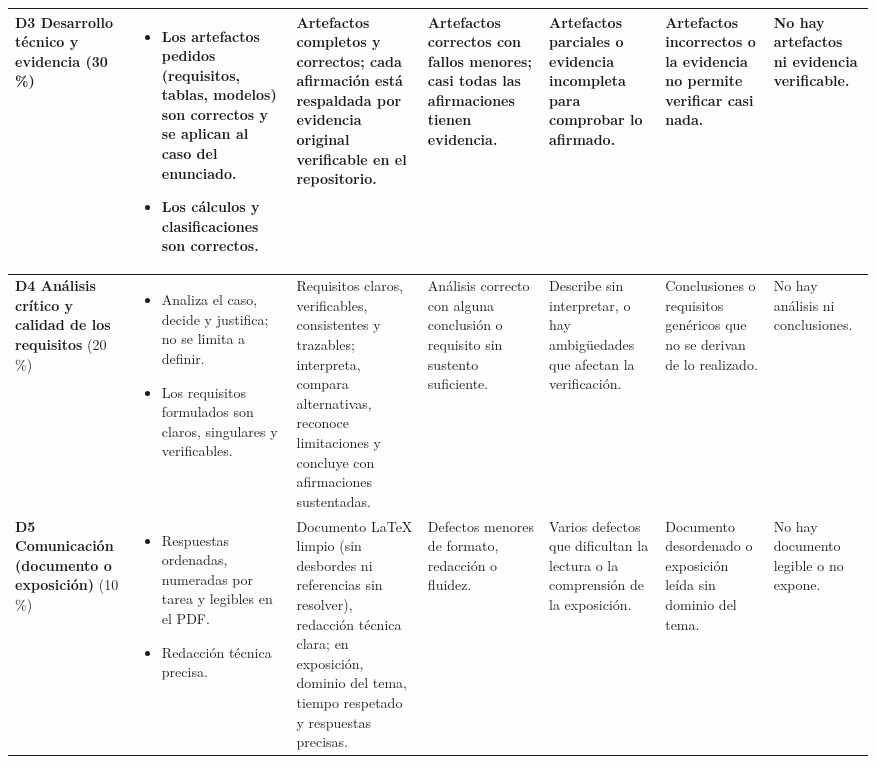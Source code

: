 \documentclass[11pt]{article}
\begin{document}
\begin{landscape}
{\begin{longtable}{|L{2.4cm}|L{5.6cm}|L{3.1cm}|L{2.8cm}|L{2.8cm}|L{2.7cm}|L{2.1cm}|}
	\hline
	\textbf{D3 Desarrollo técnico y evidencia} (30\,\%) & \begin{itemize}[leftmargin=9pt,itemsep=0pt,topsep=0pt,parsep=0pt,partopsep=0pt,after=\vspace{-\baselineskip}]\item Los artefactos pedidos (requisitos, tablas, modelos) son correctos y se aplican al caso del enunciado.\item Los cálculos y clasificaciones son correctos.\end{itemize} & Artefactos completos y correctos; cada afirmación está respaldada por evidencia original verificable en el repositorio. & Artefactos correctos con fallos menores; casi todas las afirmaciones tienen evidencia. & Artefactos parciales o evidencia incompleta para comprobar lo afirmado. & Artefactos incorrectos o la evidencia no permite verificar casi nada. & No hay artefactos ni evidencia verificable.\\
	\hline
	\textbf{D4 Análisis crítico y calidad de los requisitos} (20\,\%) & \begin{itemize}[leftmargin=9pt,itemsep=0pt,topsep=0pt,parsep=0pt,partopsep=0pt,after=\vspace{-\baselineskip}]\item Analiza el caso, decide y justifica; no se limita a definir.\item Los requisitos formulados son claros, singulares y verificables.\end{itemize} & Requisitos claros, verificables, consistentes y trazables; interpreta, compara alternativas, reconoce limitaciones y concluye con afirmaciones sustentadas. & Análisis correcto con alguna conclusión o requisito sin sustento suficiente. & Describe sin interpretar, o hay ambigüedades que afectan la verificación. & Conclusiones o requisitos genéricos que no se derivan de lo realizado. & No hay análisis ni conclusiones.\\
	\hline
	\textbf{D5 Comunicación (documento o exposición)} (10\,\%) & \begin{itemize}[leftmargin=9pt,itemsep=0pt,topsep=0pt,parsep=0pt,partopsep=0pt,after=\vspace{-\baselineskip}]\item Respuestas ordenadas, numeradas por tarea y legibles en el PDF.\item Redacción técnica precisa.\end{itemize} & Documento \LaTeX{} limpio (sin desbordes ni referencias sin resolver), redacción técnica clara; en exposición, dominio del tema, tiempo respetado y respuestas precisas. & Defectos menores de formato, redacción o fluidez. & Varios defectos que dificultan la lectura o la comprensión de la exposición. & Documento desordenado o exposición leída sin dominio del tema. & No hay documento legible o no expone.\\

\end{longtable}}
\end{landscape}
\end{document}
